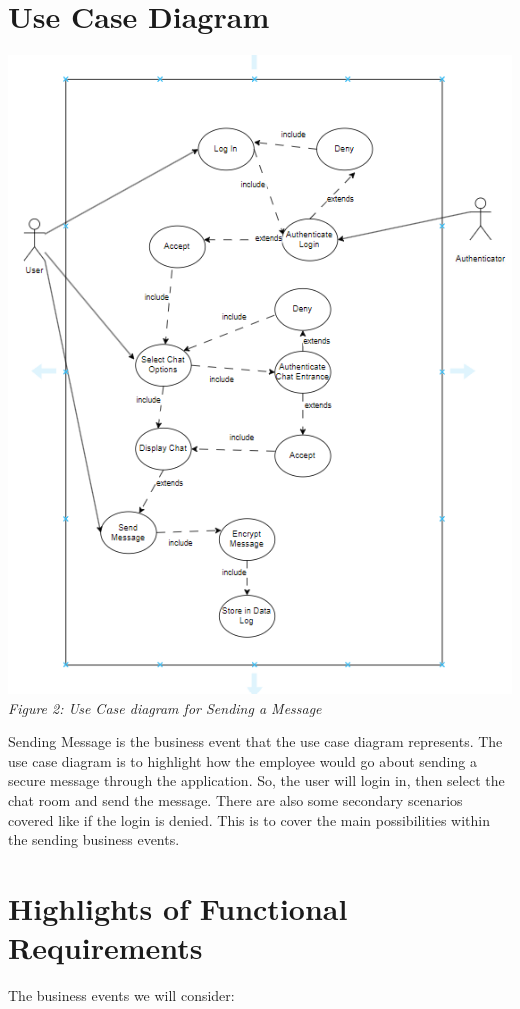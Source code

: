 \documentclass[]{article}
\begin{document}
\section{Use Case Diagram}
\label{sec:use_case_diagram}
\begin{center}
    \includegraphics{Graphics/usecaseBetter.png}\\
    \emph{Figure 2: Use Case diagram for Sending a Message}
\end{center}

\hspace{5mm}Sending Message is the business event that the use case diagram represents. The use case diagram is to highlight how the employee would go about sending a secure message through the application. So, the user will login in, then select the chat room and send the message. There are also some secondary scenarios covered like if the login is denied. This is to cover the main possibilities within the sending business events.

\section{Highlights of Functional Requirements}
\label{sec:functional_requirements}
The business events we will consider:
\end{document}
